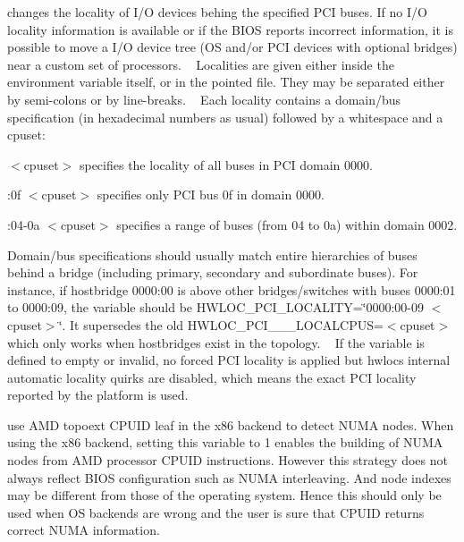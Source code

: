 \begin{DoxyDescription}
\item[H\+W\+L\+O\+C\+\_\+\+P\+C\+I\+\_\+\+L\+O\+C\+A\+L\+I\+TY=$<$domain/bus$>$ $<$cpuset$>$;... ]
\item[H\+W\+L\+O\+C\+\_\+\+P\+C\+I\+\_\+\+L\+O\+C\+A\+L\+I\+TY=/path/to/pci/locality/file ]changes the locality of I/O devices behing the specified P\+CI buses. If no I/O locality information is available or if the B\+I\+OS reports incorrect information, it is possible to move a I/O device tree (OS and/or P\+CI devices with optional bridges) near a custom set of processors. ~\newline
 Localities are given either inside the environment variable itself, or in the pointed file. They may be separated either by semi-\/colons or by line-\/breaks. ~\newline
 Each locality contains a domain/bus specification (in hexadecimal numbers as usual) followed by a whitespace and a cpuset\+: 
\begin{DoxyItemize}
\item { $<$cpuset$>$} specifies the locality of all buses in P\+CI domain 0000. 
\item {\+:0f $<$cpuset$>$} specifies only P\+CI bus 0f in domain 0000. 
\item {\+:04-\/0a $<$cpuset$>$} specifies a range of buses (from 04 to 0a) within domain 0002. 
\end{DoxyItemize}Domain/bus specifications should usually match entire hierarchies of buses behind a bridge (including primary, secondary and subordinate buses). For instance, if hostbridge 0000\+:00 is above other bridges/switches with buses 0000\+:01 to 0000\+:09, the variable should be H\+W\+L\+O\+C\+\_\+\+P\+C\+I\+\_\+\+L\+O\+C\+A\+L\+I\+TY=\char`\"{}0000\+:00-\/09 $<$cpuset$>$\char`\"{}. It supersedes the old H\+W\+L\+O\+C\+\_\+\+P\+C\+I\+\_\+\_\+\_\+\+L\+O\+C\+A\+L\+C\+P\+US=$<$cpuset$>$ which only works when hostbridges exist in the topology. ~\newline
 If the variable is defined to empty or invalid, no forced P\+CI locality is applied but hwloc\textquotesingle{}s internal automatic locality quirks are disabled, which means the exact P\+CI locality reported by the platform is used. 


\item[H\+W\+L\+O\+C\+\_\+\+X86\+\_\+\+T\+O\+P\+O\+E\+X\+T\+\_\+\+N\+U\+M\+A\+N\+O\+D\+ES=0 ]use A\+MD topoext C\+P\+U\+ID leaf in the x86 backend to detect N\+U\+MA nodes. When using the x86 backend, setting this variable to 1 enables the building of N\+U\+MA nodes from A\+MD processor C\+P\+U\+ID instructions. However this strategy does not always reflect B\+I\+OS configuration such as N\+U\+MA interleaving. And node indexes may be different from those of the operating system. Hence this should only be used when OS backends are wrong and the user is sure that C\+P\+U\+ID returns correct N\+U\+MA information. 



\end{DoxyDescription}
